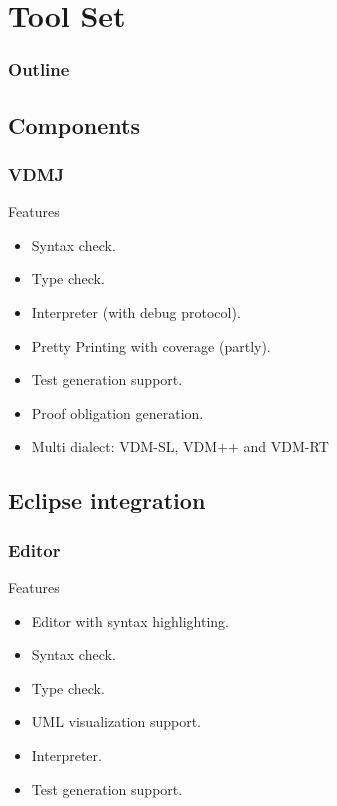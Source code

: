 \documentclass[slidestop,uncompress,mathserif,final]{beamer}
\begin{document}
\section{Tool Set}

\begin{frame}
  \frametitle{Outline}
  \tableofcontents[current]
\end{frame}

\subsection{Components}
\frame
{
  \frametitle{VDMJ}

  \begin{block}{Features}
	\begin{itemize}
		\item Syntax check.      
		\item Type check.
		\item Interpreter (with debug protocol).
		\item Pretty Printing with coverage (partly).
		\item Test generation support.
		\item Proof obligation generation.
		\item Multi dialect: VDM-SL, VDM++ and VDM-RT
  \end{itemize}
  \end{block}
}

\subsection{Eclipse integration}
\frame
{
  \frametitle{Editor}

  \begin{block}{Features}
	\begin{itemize}
	  \item Editor with syntax highlighting.
	  \item Syntax check.      
	  \item Type check.
	  \item UML visualization support.
	  \item Interpreter.
	  \item Test generation support.
  \end{itemize}
  \end{block}
}
\end{document}
